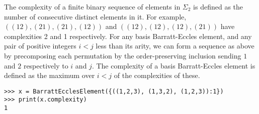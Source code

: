 \documentclass{amsart}
\begin{document}
The complexity of a finite binary sequence of elements in $\Sigma_2$ is defined as the number of consecutive distinct elements in it. For example, $((12),(21),(21),(12))$ and $((12),(12),(12),(21))$ have complexities 2 and 1 respectively. For any basis Barratt-Eccles element, and any pair of positive integers $i < j$ less than its arity, we can form a sequence as above by precomposing each permutation by the order-preserving inclusion sending $1$ and $2$ respectively to $i$ and $j$. The complexity of a basis Barratt-Eccles element is defined as the maximum over $i < j$ of the complexities of these.

\begin{verbatim}
>>> x = BarrattEcclesElement({((1,2,3), (1,3,2), (1,2,3)):1})
>>> print(x.complexity)
1
\end{verbatim}



\end{document}
